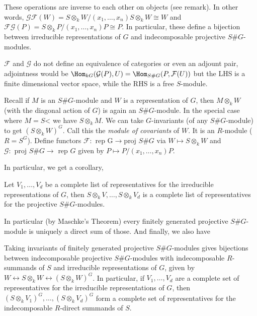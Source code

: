 \begin{prop}
These operations are inverse to each other on objects (see remark). In other words, $\mathcal{G} \mathcal{F}(W)= S\otimes_k W/(x_1,\ldots,x_n) S \otimes_k W \cong W$ and $\mathcal{F} \mathcal{G}(P)= S \otimes_k P/(x_1,\ldots,x_n)P \cong P$. In particular, these define a bijection between irreducible representations of $G$ and indecomposable projective $S\#G$-modules. 
\end{prop}







\begin{rem}
$\mathcal{F}$ and $\mathcal{G}$ do not define an equivalence of categories or even an adjount pair, adjointness would be $\Hom_{kG}(\mathcal{G}(P),U) = \Hom_{S\#G}(P,\mathcal{F}(U))$ but the LHS is a finite dimensional vector space, while the RHS is a free $S$-module. 
\end{rem}








Recall if $M$ is an $S\#G$-module and $W$ is a representation of $G$, then $M \otimes_k W$ (with the diagonal action of $G$) is again an $S\#G$-module. In the special case where $M=S$< we have $S \otimes_k M$. We can take $G$-invariants (of any $S\#G$-module) to get $(S \otimes_k W)^G$. Call this the \emph{module of covariants} of $W$. It is an $R$-module ($R=S^G$). Define functors $\mathcal{F}: \text{ rep G} \to \text{proj }S\#G$ via $W \mapsto S \otimes_k W$ and $\mathcal{G}: \text{ proj }S\#G \to \text{ rep }G$ given by $P \mapsto P/(x_1,\ldots,x_n)P$. 


In particular, we get a corollary,

\begin{cor}
Let $V_1,\ldots,V_d$ be a complete list of representatives for the irreducible representations of $G$, then $S \otimes_k V, \ldots, S \otimes_k V_d$ is a complete list of representatives for the projective $S\#G$-modules. 
\end{cor}


In particular (by Maschke's Theorem) every finitely generated projective $S\#G$-module is uniquely a direct sum of those. And finally, we also have

\begin{cor}
Taking invariants of finitely generated projective $S\#G$-modules gives bijections between indecomposable projective $S\#G$-modules with indecomposable $R$-summands of $S$ and irreducible representations of $G$, given by $W \leftrightarrow S \otimes_k W \leftrightarrow (S \otimes_k W)^G$. In particular, if $V_1,\ldots,V_d$ are a complete set of representatives for the irreducible representations of $G$, then $(S \otimes_k V_1)^G, \ldots, (S \otimes_k V_d)^G$ form a complete set of representatives for the indecomposable $R$-direct summands of $S$. 
\end{cor}



